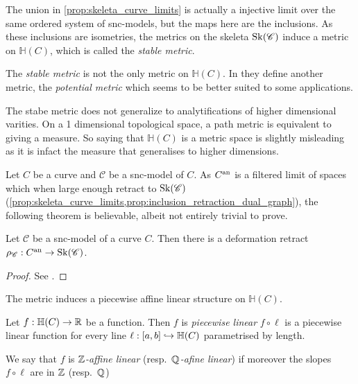 The union in \cref{prop:skeleta_curve_limits} is actually a injective limit over the same ordered system of snc-models, but the maps here are the inclusions. 
As these inclusions are isometries, the metrics on the skeleta $\operatorname{Sk}(\mathscr C)$ induce a metric on $\mathbb{H}(C)$, which is called the \emph{stable metric}. 

\begin{remark}
	The \emph{stable metric} is not the only metric on $\mathbb{H}(C)$. 
	In \cite{bakerWeightFunctionsBerkovich2016} they define another metric, the \emph{potential metric} which seems to be better suited to some applications. 
\end{remark}

\begin{remark}
	The stabe metric does not generalize to analytifications of higher dimensional varities. 
	On a 1 dimensional topological space, a path metric is equivalent to giving a measure. 
	So saying that $\mathbb{H}(C)$ is a metric space is slightly misleading as it is infact the measure that generalises to higher dimensions. 
\end{remark}

Let $C$ be a curve and $\mathscr C$ be a snc-model of $C$. 
As $C{}^{\text{an}}$ is a filtered limit of spaces which when large enough retract to $\operatorname{Sk}(\mathscr C)$ (\cref{prop:skeleta_curve_limits,prop:inclusion_retraction_dual_graph}), the following theorem is believable, albeit not entirely trivial to prove. 
\begin{proposition}\label{prop:retract_analytification_skeleton}
	Let $\mathscr C$ be a snc-model of a curve $C$. 
	Then there is a deformation retract $\rho_{\mathscr C}: C{}^{\text{an}} \to \operatorname{Sk}(\mathscr C)$. 
\end{proposition}
\begin{proof}
	See \cite[§2.2.2]{bakerWeightFunctionsBerkovich2016}.
\end{proof}

The metric induces a piecewise affine linear structure on $\mathbb{H}(C)$. 
\begin{definition}
	Let $f: \mathbb{H}(C) \to \mathbb{R}$ be a function. 
	Then $f$ is \emph{piecewise linear} $f \circ \ell$  is a piecewise linear function for every line $\ell: [a, b] \hookrightarrow \mathbb{H}(C)$ parametrised by length. 

	We say that $f$ is \emph{$\mathbb{Z}$-affine linear} (resp.\ \emph{$\mathbb{Q}$-afine linear}) if moreover the slopes $f \circ \ell$ are in $\mathbb{Z} $ (resp.\ $\mathbb{Q}$)
\end{definition}




